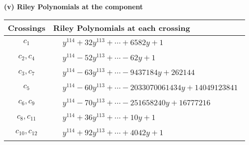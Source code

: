 \documentclass[1p]{elsarticle_modified}
\theoremstyle{definition}
\begin{document}
\flushleft \textbf{(v) Riley Polynomials at the component}\newline \\
\begin{tabular}{m{50pt}|m{274pt}}
Crossings & \hspace{64pt}Riley Polynomials at each crossing \\
\hline $$\begin{aligned}c_{1}\end{aligned}$$&$\begin{aligned}
&y^{114}+32 y^{113}+\cdots+6582 y+1
\end{aligned}$\\
\hline $$\begin{aligned}c_{2},c_{4}\end{aligned}$$&$\begin{aligned}
&y^{114}-52 y^{113}+\cdots-62 y+1
\end{aligned}$\\
\hline $$\begin{aligned}c_{3},c_{7}\end{aligned}$$&$\begin{aligned}
&y^{114}-63 y^{113}+\cdots-9437184 y+262144
\end{aligned}$\\
\hline $$\begin{aligned}c_{5}\end{aligned}$$&$\begin{aligned}
&y^{114}-60 y^{113}+\cdots-2033070061434 y+14049123841
\end{aligned}$\\
\hline $$\begin{aligned}c_{6},c_{9}\end{aligned}$$&$\begin{aligned}
&y^{114}-70 y^{113}+\cdots-251658240 y+16777216
\end{aligned}$\\
\hline $$\begin{aligned}c_{8},c_{11}\end{aligned}$$&$\begin{aligned}
&y^{114}+36 y^{113}+\cdots+10 y+1
\end{aligned}$\\
\hline $$\begin{aligned}c_{10},c_{12}\end{aligned}$$&$\begin{aligned}
&y^{114}+92 y^{113}+\cdots+4042 y+1
\end{aligned}$\\
\hline
\end{tabular}\\~\\
\end{document}
